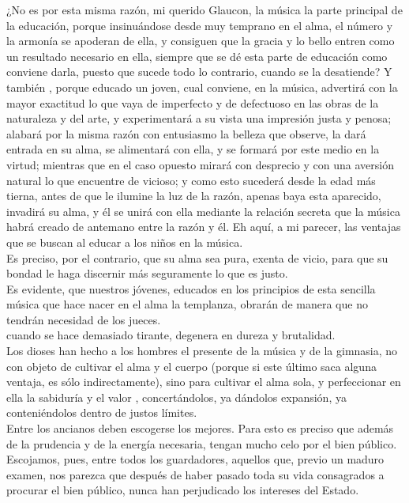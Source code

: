 \documentclass[10pt]{book}
\begin{document}
 ¿No es por esta misma razón, mi querido Glaucon, la música la parte principal de la educación, porque insinuándose desde muy temprano en el alma, el número y la armonía se apoderan de ella, y consiguen que la gracia y lo bello entren como un resultado necesario en ella, siempre que se dé esta parte de educación como conviene darla, puesto que sucede todo lo contrario, cuando se la desatiende? Y también , porque educado un joven, cual conviene, en la música, advertirá con la mayor exactitud lo que vaya de imperfecto y de defectuoso en las obras de la naturaleza y del arte, y experimentará a su vista una impresión justa y penosa; alabará por la misma razón con entusiasmo la belleza que observe, la dará entrada en su alma, se alimentará con ella, y se formará por este medio en la virtud; mientras que en el caso opuesto mirará con desprecio y con una aversión natural lo que encuentre de vicioso; y como esto sucederá desde la edad más tierna, antes de que le ilumine la luz de la razón, apenas baya esta aparecido, invadirá su alma, y él se unirá con ella mediante la relación secreta que la música habrá creado de antemano entre la razón y él. Eh aquí, a mi parecer, las ventajas que se buscan al educar a los niños en la música. \\
Es preciso, por el contrario, que su alma sea pura, exenta de vicio, para que su bondad le haga discernir más seguramente lo que es justo.\\
Es evidente, que nuestros jóvenes, educados en los principios de esta sencilla música que hace nacer en el alma la templanza, obrarán de manera que no tendrán necesidad de los jueces. \\
cuando se hace demasiado tirante, degenera en dureza y brutalidad.\\
 Los dioses han hecho a los hombres el presente de la música y de la gimnasia, no con objeto de cultivar el alma y el cuerpo (porque si este último saca alguna ventaja, es sólo indirectamente), sino para cultivar el alma sola, y perfeccionar en ella la sabiduría y el valor , concertándolos, ya dándolos expansión, ya conteniéndolos dentro de justos límites.\\
Entre los ancianos deben escogerse los mejores. Para esto es preciso que además de la prudencia y de la energía necesaria, tengan mucho celo por el bien público. Escojamos, pues, entre todos los guardadores, aquellos que, previo un maduro examen, nos parezca que después de haber pasado toda su vida consagrados a procurar el bien público, nunca han perjudicado los intereses del Estado. \\
\end{document}
